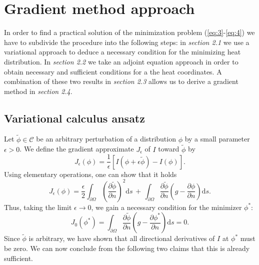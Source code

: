 \section{Gradient method approach}
In order to find a practical solution of the minimization problem (\ref{eq:3}-\ref{eq:4}) we have to subdivide the procedure into the following steps: in \textit{section 2.1} we use a variational approach to deduce a necessary condition for the minimizing heat distribution. In \textit{section 2.2} we take an adjoint equation approach in order to obtain necessary and sufficient conditions for a the heat coordinates. A combination of these two results in \textit{section 2.3} allows us to derive a gradient method in \textit{section 2.4}.

\subsection{Variational calculus ansatz}
Let $\widetilde{\phi}\in\mathcal{C}$ be an arbitrary perturbation of a distribution $\phi$ by a small parameter $\epsilon>0$. We define the gradient approximate $J_\epsilon$ of $I$ toward $\widetilde{\phi}$ by
\begin{equation}\label{eq:5}
	J_\epsilon(\phi) =
	\frac{1}{\epsilon}
	\left[
		I(\phi+\epsilon\widetilde{\phi})-I(\phi)
	\right].
\end{equation}
Using elementary operations, one can show that it holds
\begin{equation}\label{eq:6}
	J_\epsilon(\phi) =
	\frac{\epsilon}{2}\int_{\partial\Omega} \left(\frac{\partial\widetilde{\phi}}{\partial n}\right)^2 \mathrm{d}s
	\,+\,\int_{\partial\Omega} \frac{\partial\widetilde{\phi}}{\partial n} 
		\left(g-\frac{\partial\phi}{\partial n}\right) \mathrm{d}s.
\end{equation}
Thus, taking the limit $\epsilon\to 0$, we gain a necessary condition for the minimizer $\phi^*$:
\begin{equation}\label{eq:7}
	J_0(\phi^*) = 
	\int_{\partial\Omega} \frac{\partial\widetilde{\phi}}{\partial n} 
		\left(g-\frac{\partial\phi^*}{\partial n}\right) \mathrm{d}s
	= 0.
\end{equation}
Since $\widetilde{\phi}$ is arbitrary, we have shown that all directional derivatives of $I$ at $\phi^*$ must be zero. We can now conclude from the following two claims that this is already sufficient. 

